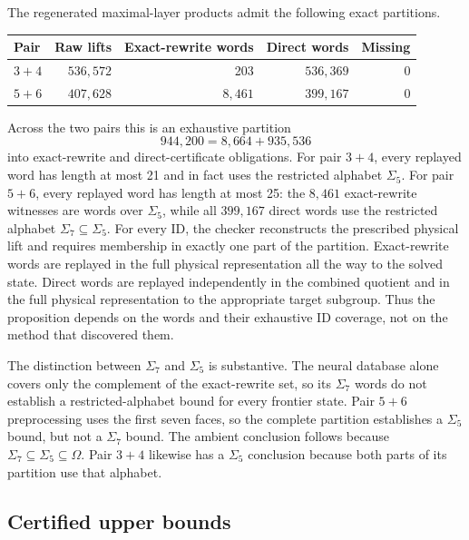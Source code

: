 \begin{proposition}
\label{prop:certificate-coverage}
The regenerated maximal-layer products admit the following exact partitions.
\begin{center}
\begin{tabular}{@{}lrrrr@{}}
\toprule
Pair & Raw lifts & Exact-rewrite words & Direct words & Missing \\
\midrule
$3+4$ & $536{,}572$ & 203 & $536{,}369$ & 0 \\
$5+6$ & $407{,}628$ & $8{,}461$ & $399{,}167$ & 0 \\
\bottomrule
\end{tabular}
\end{center}
Across the two pairs this is an exhaustive partition
\[
  944{,}200=8{,}664+935{,}536
\]
into exact-rewrite and direct-certificate obligations.
For pair $3+4$, every replayed word has length at most 21 and in fact uses the
restricted alphabet $\Sigma_5$.  For pair $5+6$, every replayed word has
length at most 25: the $8{,}461$ exact-rewrite witnesses are words over
$\Sigma_5$, while all $399{,}167$ direct words use the restricted alphabet
$\Sigma_7\subseteq\Sigma_5$.  For every ID, the checker reconstructs the
prescribed physical lift and requires membership in exactly one part of the
partition.  Exact-rewrite words are replayed in the full physical
representation all the way to the solved state.  Direct words are replayed
independently in the combined quotient and in the full physical
representation to the appropriate target subgroup.  Thus the proposition
depends on the words and their exhaustive ID coverage, not on the method that
discovered them.
\end{proposition}

\begin{remark}
\label{rem:alphabet-scope}
The distinction between $\Sigma_7$ and $\Sigma_5$ is substantive.  The neural
database alone covers only the complement of the exact-rewrite set, so its
$\Sigma_7$ words do not establish a restricted-alphabet bound for every
frontier state.  Pair $5+6$ preprocessing uses the first seven faces, so the
complete partition establishes a $\Sigma_5$ bound, but not a $\Sigma_7$
bound.  The ambient conclusion follows because
$\Sigma_7\subseteq\Sigma_5\subseteq\Omega$.  Pair $3+4$ likewise has a
$\Sigma_5$ conclusion because both parts of its partition use that alphabet.
\end{remark}

\subsection{Certified upper bounds}
\label{sec:certified-bounds}


